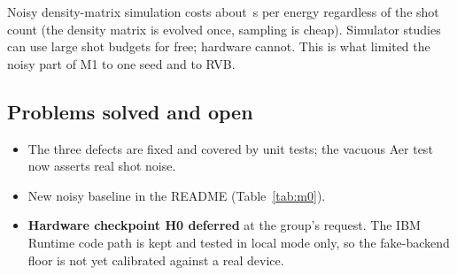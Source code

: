\begin{rem}
  Noisy density-matrix simulation costs about \VSecPerEnergy{}\,s per energy regardless of the
  shot count (the density matrix is evolved once, sampling is cheap). Simulator studies can use
  large shot budgets for free; hardware cannot. This is what limited the noisy part of M1 to one
  seed and to RVB.
\end{rem}

\subsection{Problems solved and open}

\begin{itemize}
  \item[\checkmark] The three defects are fixed and covered by unit tests; the vacuous Aer test
    now asserts real shot noise.
  \item[\checkmark] New noisy baseline in the README (Table~\ref{tab:m0}).
  \item[$\circ$] \textbf{Hardware checkpoint H0 deferred} at the group's request. The IBM
    Runtime code path is kept and tested in local mode only, so the fake-backend floor is not yet
    calibrated against a real device.
\end{itemize}
